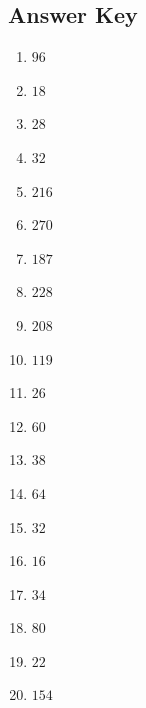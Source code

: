 \documentclass{article}
\begin{document}
\newpage

\subsection*{Answer Key}

\begin{enumerate}
\item $\displaystyle 96 $ \ 
\item $\displaystyle 18 $ \ 
\item $\displaystyle 28 $ \ 
\item $\displaystyle 32 $ \ 
\item $\displaystyle 216 $ \ 
\item $\displaystyle 270 $ \ 
\item $\displaystyle 187 $ \ 
\item $\displaystyle 228 $ \ 
\item $\displaystyle 208 $ \ 
\item $\displaystyle 119 $ \ 
\item $\displaystyle 26 $ \ 
\item $\displaystyle 60 $ \ 
\item $\displaystyle 38 $ \ 
\item $\displaystyle 64 $ \ 
\item $\displaystyle 32 $ \ 
\item $\displaystyle 16 $ \ 
\item $\displaystyle 34 $ \ 
\item $\displaystyle 80 $ \ 
\item $\displaystyle 22 $ \ 
\item $\displaystyle 154 $ \ 

\end{enumerate}
\end{document}
